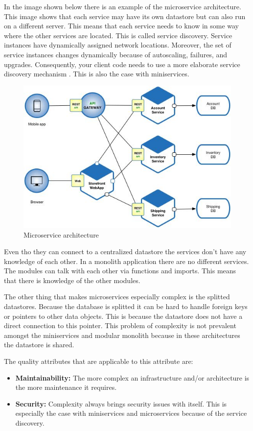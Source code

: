 In the image shown below there is an example of the microservice architecture. This image shows that each service may have its own datastore but can also run on a different server. This means that each service needs to know in some way where the other services are located. This is called service discovery. Service instances have dynamically assigned network locations. Moreover, the set of service instances changes dynamically because of autoscaling, failures, and upgrades. Consequently, your client code needs to use a more elaborate service discovery mechanism \cite{serviceDiscovery}. This is also the case with miniservices.

\begin{figure}[H]
	\includegraphics[width=\linewidth]{microservice-architecture.png}
	\caption{Microservice architecture}
\end{figure}

Even tho they can connect to a centralized datastore the services don’t have any knowledge of each other. In a monolith application there are no different services. The modules can talk with each other via functions and imports. This means that there is knowledge of the other modules.

The other thing that makes microservices especially complex is the splitted datastores. Because the database is splitted it can be hard to handle foreign keys or pointers to other data objects. This is because the datastore does not have a direct connection to this pointer. This problem of complexity is not prevalent amongst the miniservices and modular monolith because in these architectures the datastore is shared.

The quality attributes that are applicable to this attribute are:
\begin{itemize}
        \item \textbf{Maintainability:} The more complex an infrastructure and/or architecture is the more maintenance it requires.
        \item \textbf{Security:} Complexity always brings security issues with itself. This is especially the case with miniservices and microservices because of the service discovery.
\end{itemize}

